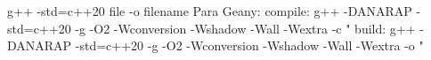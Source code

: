 \begin{code}
g++ -std=c++20 {file} -o {filename}
Para Geany:
compile: g++ -DANARAP -std=c++20 -g -O2 -Wconversion -Wshadow -Wall -Wextra -c "%
build:   g++ -DANARAP -std=c++20 -g -O2 -Wconversion -Wshadow -Wall -Wextra -o "%
\end{code}